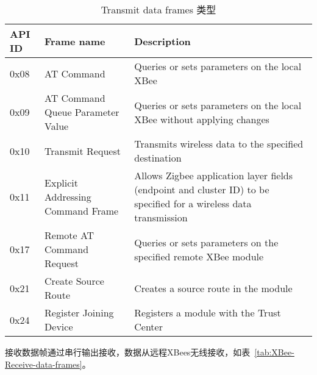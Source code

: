 \begin{table}[htbp]
    \begin{tabular}{@{}lll@{}}
    \toprule
    API ID & Frame name                        & Description                                                                                                       \\ \midrule
    0x08   & AT Command                        & Queries or sets parameters on the local XBee                                                                      \\
    0x09   & AT Command Queue Parameter Value  & Queries or sets parameters on the local XBee without applying changes                                             \\
    0x10   & Transmit Request                  & Transmits wireless data to the specified destination                                                              \\
    0x11   & Explicit Addressing Command Frame & Allows Zigbee application layer fields (endpoint and cluster ID) to be specified for a wireless data transmission \\
    0x17   & Remote AT Command Request         & Queries or sets parameters on the specified remote XBee module                                                    \\
    0x21   & Create Source Route               & Creates a source route in the module                                                                              \\
    0x24   & Register Joining Device           & Registers a module with the Trust Center                                                                          \\ \bottomrule
    \end{tabular}
    \caption{Transmit data frames 类型}
    \label{tab:XBee-Transmit-data-frames}
\end{table}

接收数据帧通过串行输出接收，数据从远程XBees无线接收，如表~\ref{tab:XBee-Receive-data-frames}。

